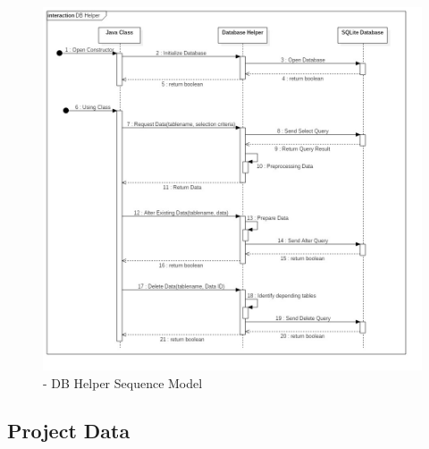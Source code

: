 \begin{figure}[h] 
	\centering 
	\includegraphics[width=14cm]{images/DBHelper.jpg} 
	\caption{- DB Helper Sequence Model} 
	\label{fig:sequenceDBHelper}
\end{figure}

\subsection{Project Data}

